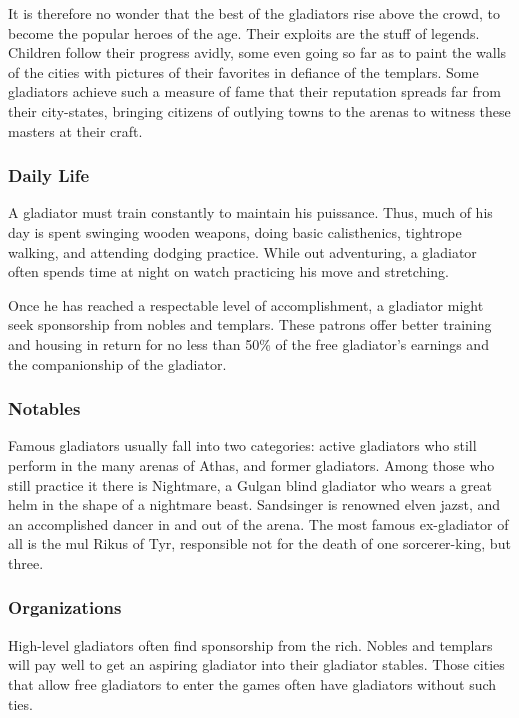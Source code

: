It is therefore no wonder that the best of the gladiators rise above the crowd, to become the popular heroes of the age. Their exploits are the stuff of legends. Children follow their progress avidly, some even going so far as to paint the walls of the cities with pictures of their favorites in defiance of the templars. Some gladiators achieve such a measure of fame that their reputation spreads far from their city-states, bringing citizens of outlying towns to the arenas to witness these masters at their craft.

\subsubsection{Daily Life}

A gladiator must train constantly to maintain his puissance. Thus, much of his day is spent swinging wooden weapons, doing basic calisthenics, tightrope walking, and attending dodging practice. While out adventuring, a gladiator often spends time at night on watch practicing his move and stretching.

Once he has reached a respectable level of accomplishment, a gladiator might seek sponsorship from nobles and templars. These patrons offer better training and housing in return for no less than 50\% of the free gladiator's earnings and the companionship of the gladiator.

\subsubsection{Notables}

Famous gladiators usually fall into two categories: active gladiators who still perform in the many arenas of Athas, and former gladiators. Among those who still practice it there is Nightmare, a Gulgan blind gladiator who wears a great helm in the shape of a nightmare beast. Sandsinger is renowned elven jazst, and an accomplished dancer in and out of the arena. The most famous ex-gladiator of all is the mul Rikus of Tyr, responsible not for the death of one sorcerer-king, but three.

\subsubsection{Organizations}

High-level gladiators often find sponsorship from the rich. Nobles and templars will pay well to get an aspiring gladiator into their gladiator stables. Those cities that allow free gladiators to enter the games often have gladiators without such ties.

